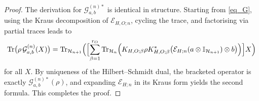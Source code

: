 \documentclass[10pt,a4paper]{amsart}
\begin{document}
\begin{proof}
The derivation for $\mathcal{G}_{a,b}^{(n)*}$ is identical in structure. Starting from \eqref{eq_G}, using the Kraus decomposition of $\mathcal{E}_{H,O;n}$, cycling the trace, and factorising via partial traces leads to
\[
\operatorname{Tr}\bigl(\rho\,\mathcal{G}_{a,b}^{(n)}(X)\bigr)
=
\operatorname{Tr}_{\mathcal{H}_{n+1}}\Bigl(
\Bigl[
\sum_{\beta=1}^{r_O}
\operatorname{Tr}_{\mathcal{H}_n}\Bigl(
K_{H,O;\beta}\rho K_{H,O;\beta}^{*}
\bigl(\mathcal{E}_{H;n}(a\otimes\mathbb{I}_{\mathcal{H}_{n+1}})\otimes b\bigr)
\Bigr)
\Bigr]X
\Bigr)
\]
for all $X$. By uniqueness of the Hilbert–Schmidt dual, the bracketed operator is exactly $\mathcal{G}_{a,b}^{(n)*}(\rho)$, and expanding $\mathcal{E}_{H;n}$ in its Kraus form yields the second formula. This completes the proof.
\end{proof}
\end{document}
